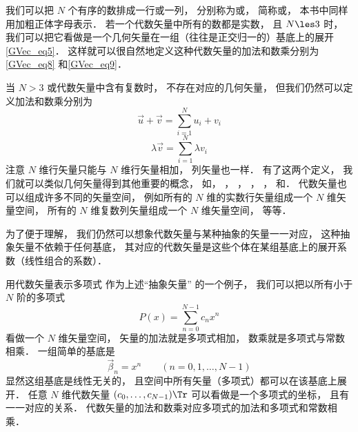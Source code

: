 

我们可以把 $N$ 个有序的数排成一行或一列， 分别称为或， 简称或， 本书中同样用加粗正体字母表示． 若一个代数矢量中所有的数都是实数， 且 $N \les 3$%
时， 我们可以把它看做是一个几何矢量在一组（往往是正交归一的）基底上的展开\autoref{GVec_eq5}． 这样就可以很自然地定义这种代数矢量的加法和数乘分别为\autoref{GVec_eq8} 和\autoref{GVec_eq9}．

当 $N > 3$ 或代数矢量中含有复数时， 不存在对应的几何矢量， 但我们仍然可以定义加法和数乘分别为
\begin{equation}
\vec u + \vec v = \sum_{i = 1}^N u_i + v_i
\end{equation}
\begin{equation}
\lambda \vec v = \sum_{i = 1}^N \lambda v_i
\end{equation}
注意 $N$ 维行矢量只能与 $N$ 维行矢量相加， 列矢量也一样． 有了这两个定义， 我们就可以类似几何矢量得到其他重要的概念， 如， ， ， ， ， 和． 代数矢量也可以组成许多不同的矢量空间， 例如所有的 $N$ 维的实数行矢量组成一个 $N$ 维矢量空间， 所有的 $N$ 维复数列矢量组成一个 $N$ 维矢量空间， 等等．

为了便于理解， 我们仍然可以想象代数矢量与某种抽象的矢量一一对应， 这种抽象矢量不依赖于任何基底， 其对应的代数矢量是这些个体在某组基底上的展开系数（线性组合的系数）．

\begin{exam}{用代数矢量表示多项式}
作为上述“抽象矢量” 的一个例子， 我们可以把以所有小于 $N$ 阶的多项式
\begin{equation}
P(x) = \sum_{n = 0}^{N-1} c_n x^n
\end{equation}
看做一个 $N$ 维矢量空间， 矢量的加法就是多项式相加， 数乘就是多项式与常数相乘． 一组简单的基底是
\begin{equation}
\vec \beta_n = x^n \qquad (n = 0, 1, \dots, N-1)
\end{equation}
显然这组基底是线性无关的， 且空间中所有矢量（多项式）都可以在该基底上展开． 任意 $N$ 维代数矢量 $(c_0, \dots, c_{N-1})\Tr$ 可以看做是一个多项式的坐标， 且有一一对应的关系． 代数矢量的加法和数乘对应多项式的加法和多项式和常数相乘．
\end{exam}

